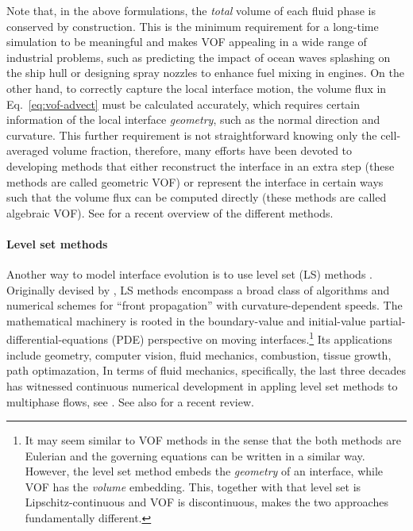 Note that, in the above formulations, the \emph{total} volume of each fluid phase is conserved by construction.
This is the minimum requirement for a long-time simulation to be meaningful and makes VOF appealing in a wide range of industrial problems, such as predicting the impact of ocean waves splashing on the ship hull or designing spray nozzles to enhance fuel mixing in engines.
On the other hand, to correctly capture the local interface motion, the volume flux in Eq.\ \eqref{eq:vof-advect} must be calculated accurately, which requires certain information of the local interface \emph{geometry}, such as the normal direction and curvature.
This further requirement is not straightforward knowing only the cell-averaged volume fraction, therefore, many efforts have been devoted to developing methods that either reconstruct the interface in an extra step (these methods are called geometric VOF) or represent the interface in certain ways such that the volume flux can be computed directly (these methods are called algebraic VOF). See \cite{mirjalili_jain_dodd_2017a} for a recent overview of the different methods.

\medskip
\paragraph{\bf Level set methods}

Another way to model interface evolution is to use level set (LS) methods \citep{sethian_1999a}.
Originally devised by \cite{Osher_Sethian_levelset}, LS methods encompass a broad class of algorithms and numerical schemes for ``front propagation'' with curvature-dependent speeds.
The mathematical machinery is rooted in the boundary-value and initial-value partial-differential-equations (PDE) perspective on moving interfaces.\footnote{It may seem similar to VOF methods in the sense that the both methods are Eulerian and the governing equations can be written in a similar way. However, the level set method embeds the \emph{geometry} of an interface, while VOF has the \emph{volume} embedding. This, together with that level set is Lipschitz-continuous and VOF is discontinuous, makes the two approaches fundamentally different.}
Its applications include geometry, computer vision, fluid mechanics, combustion, tissue growth, path optimazation, \etc
In terms of fluid mechanics, specifically, the last three decades has witnessed continuous numerical development in appling level set methods to multiphase flows, see \eg \cite{Mulder_JCP_1992, Sussman_JCP_1994, Sussman_JCP_2000, Enright_JCP_2002, Olsson_JCP_2005, Marchandise_JCP_2007, Desjardins_JCP_2008, Desjardins_JCP_2009, Aanjaneya_JCP_2013, Luo_JCP_2015, ICLS}. See also \cite{Gibou_Fedkiv_Osher} for a recent review.


